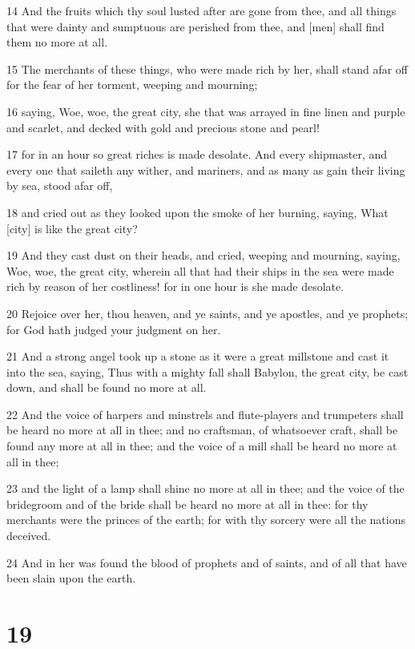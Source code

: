 \par 14 And the fruits which thy soul lusted after are gone from thee, and all things that were dainty and sumptuous are perished from thee, and [men] shall find them no more at all.
\par 15 The merchants of these things, who were made rich by her, shall stand afar off for the fear of her torment, weeping and mourning;
\par 16 saying, Woe, woe, the great city, she that was arrayed in fine linen and purple and scarlet, and decked with gold and precious stone and pearl!
\par 17 for in an hour so great riches is made desolate. And every shipmaster, and every one that saileth any wither, and mariners, and as many as gain their living by sea, stood afar off,
\par 18 and cried out as they looked upon the smoke of her burning, saying, What [city] is like the great city?
\par 19 And they cast dust on their heads, and cried, weeping and mourning, saying, Woe, woe, the great city, wherein all that had their ships in the sea were made rich by reason of her costliness! for in one hour is she made desolate.
\par 20 Rejoice over her, thou heaven, and ye saints, and ye apostles, and ye prophets; for God hath judged your judgment on her.
\par 21 And a strong angel took up a stone as it were a great millstone and cast it into the sea, saying, Thus with a mighty fall shall Babylon, the great city, be cast down, and shall be found no more at all.
\par 22 And the voice of harpers and minstrels and flute-players and trumpeters shall be heard no more at all in thee; and no craftsman, of whatsoever craft, shall be found any more at all in thee; and the voice of a mill shall be heard no more at all in thee;
\par 23 and the light of a lamp shall shine no more at all in thee; and the voice of the bridegroom and of the bride shall be heard no more at all in thee: for thy merchants were the princes of the earth; for with thy sorcery were all the nations deceived.
\par 24 And in her was found the blood of prophets and of saints, and of all that have been slain upon the earth.

\chapter{19}


